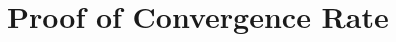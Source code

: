 \documentclass[twoside]{article}
\newcommand{\concurrency}{{concurrency}\xspace}
\begin{document}

\clearpage
\section{Proof of Convergence Rate}
\label{appendix:proof}
\end{document}
